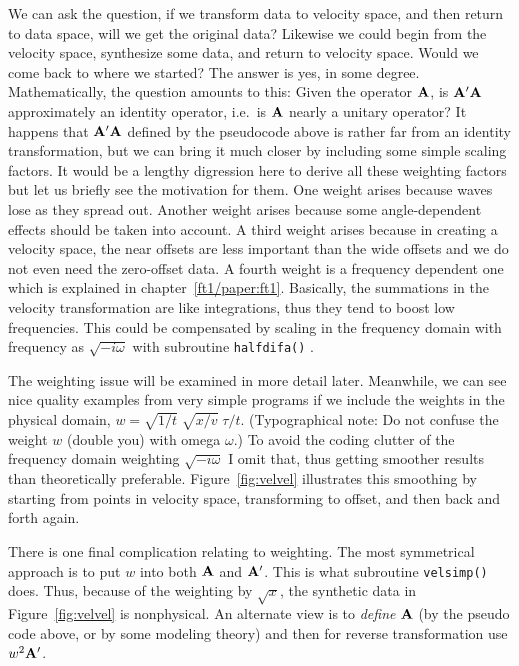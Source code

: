 \par
We can ask the question, if we transform data to velocity space,
and then return to data space,
will we get the original data?
Likewise we could begin from the velocity space,
synthesize some data, and return to velocity space.
Would we come back to where we started?
The answer is yes, in some degree.
Mathematically, the question amounts to this:
Given the operator $\bold A$, is $\bold A'\bold A$ approximately
an identity operator, i.e.~is $\bold A$ nearly a unitary operator?
It happens that $\bold A'\bold A$ defined by the pseudocode above
is rather far from an identity transformation,
but we can bring it much closer
by including some simple scaling factors.
It would be a lengthy digression here to derive all these weighting factors
but let us briefly see the motivation for them.
One weight arises because waves lose  as they spread out.
Another weight arises because some angle-dependent effects should be taken
into account.  A third weight arises because in creating a velocity space,
the near offsets are less important than the wide offsets
and we do not even need the zero-offset data.
A fourth weight is a frequency dependent one
which is explained in chapter~\ref{ft1/paper:ft1}.
Basically, the summations in the velocity transformation are like integrations,
thus they tend to boost low frequencies.
This could be compensated by scaling
in the frequency domain
with frequency as $\sqrt{-i\omega}$
with subroutine \texttt{halfdifa()} .

\par
The weighting issue will be examined in more detail later.
Meanwhile, we can see nice quality examples
from very simple programs
if we include the weights
in the physical domain, $w= \sqrt{1/t}\; \sqrt{x/v}\; \tau /t $.
(Typographical note:  Do not confuse
the weight $w$ (double you) with omega $\omega$.)
To avoid the coding clutter of the frequency domain weighting
$\sqrt{-i\omega}$ I omit that,
thus getting smoother results than theoretically preferable.
Figure~\ref{fig:velvel} illustrates this smoothing by starting
from points in velocity space, transforming to offset,
and then back and forth again.


\par
There is one final complication relating to weighting.
The most symmetrical approach is to put
$w$ into both $\bold A$ and $\bold A'$.
This is what subroutine \texttt{velsimp()}  does.
Thus, because of the weighting by $\sqrt{x}$,
the synthetic data in Figure~\ref{fig:velvel} is
nonphysical.
An alternate view is to {\em  define} $\bold A$
(by the pseudo code above, or by some modeling theory)
and then for reverse transformation
use $w^2\bold A'$.

